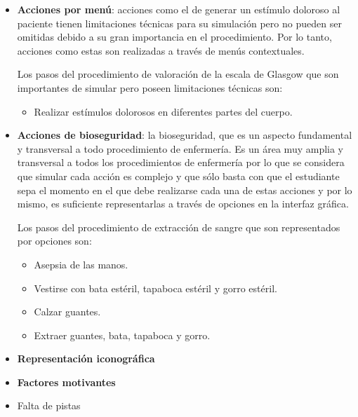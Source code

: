 \begin{itemize}
\item 
    \textbf{Acciones por menú}:  acciones como el de generar
    un estímulo doloroso al paciente tienen limitaciones técnicas para su
    simulación pero no pueden ser omitidas debido a su gran importancia en el
    procedimiento. Por lo tanto, acciones como estas son realizadas a través de
    menús contextuales.
    
    Los pasos del procedimiento de valoración de la escala de Glasgow que son
    importantes de simular pero poseen limitaciones técnicas son:
    \begin{itemize} 
    \item Realizar estímulos dolorosos en diferentes partes del cuerpo. 
    \end{itemize}
    
\item 
    \textbf{Acciones de bioseguridad}: la bioseguridad, que es un aspecto
    fundamental y transversal a todo procedimiento de enfermería. Es un área muy
    amplia y transversal a todos los procedimientos de enfermería por lo que se
    considera que simular cada acción es complejo y que sólo basta con que el
    estudiante sepa el momento en el que debe realizarse cada una de estas
    acciones y por lo mismo, es suficiente representarlas a través de opciones
    en la interfaz gráfica.
    
    Los pasos del procedimiento de extracción de sangre que son representados
    por opciones son:
    \begin{itemize}
        \item Asepsia de las manos.
        \item Vestirse con bata estéril, tapaboca estéril y gorro estéril.
        \item Calzar guantes.
        \item Extraer guantes, bata, tapaboca y gorro.
    \end{itemize}
    
\item
    \textbf{Representación iconográfica}
\item 
    \textbf{Factores motivantes}

\item 
    Falta de pistas

\end{itemize}

